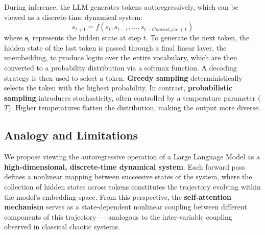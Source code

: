 \documentclass[a4paper,12pt]{article}
\begin{document}
During inference, the LLM generates tokens autoregressively, which can be viewed as a discrete-time dynamical system:
\begin{equation}
     s_{t+1} = f(s_t, s_{t-1}, ..., s_{t-Context_size+1})
\end{equation}
where $\mathbf{s}_t$ represents the hidden state at step $t$. 
To generate the next token, the hidden state of the last token is passed through a final linear layer, the unembedding, to produce logits over the entire vocabulary, which are then converted to a probability distribution via a softmax function. A decoding strategy is then used to select a token. \textbf{Greedy sampling} deterministically selects the token with the highest probability. In contrast, \textbf{probabilistic sampling} introduces stochasticity, often controlled by a temperature parameter ($T$). Higher temperatures flatten the distribution, making the output more diverse.



\subsection{Analogy and Limitations}
\label{subsec:analogy_limitations}
We propose viewing the autoregressive operation of a Large Language Model as a \textbf{high-dimensional, discrete-time dynamical system}. Each forward pass defines a nonlinear mapping between successive states of the system, where the collection of hidden states across tokens constitutes the trajectory evolving within the model’s embedding space. From this perspective, the \textbf{self-attention mechanism} serves as a state-dependent nonlinear coupling between different components of this trajectory — analogous to the inter-variable coupling observed in classical chaotic systems.

\end{document}
